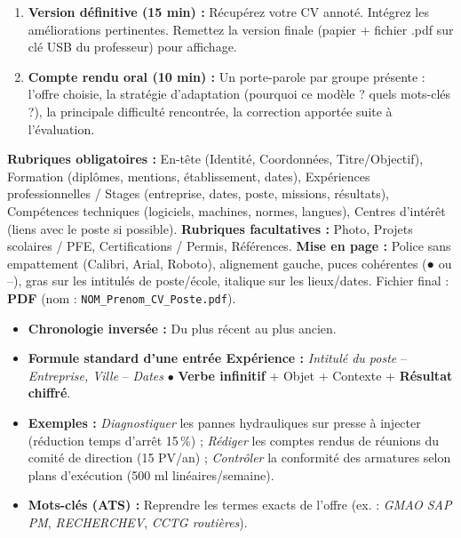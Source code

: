 \documentclass[11pt]{article}
\newcounter{popsec}
\newcounter{popsub}
\newcommand{\courssub}[1]{%
  \stepcounter{popsub}%
  \par\vspace{9pt}\noindent{\popxbold\fontsize{11.5}{13}\selectfont\color{popink}{\color{poporange}\thepopsec.\thepopsub}\hspace{6pt}#1}\par\nopagebreak\vspace{4pt}
}
\begin{document}
\begin{enumerate}
    \item \textbf{Version définitive (15 min) :} Récupérez votre CV annoté. Intégrez les améliorations pertinentes. Remettez la version finale (papier + fichier .pdf sur clé USB du professeur) pour affichage.
    \item \textbf{Compte rendu oral (10 min) :} Un porte-parole par groupe présente : l'offre choisie, la stratégie d'adaptation (pourquoi ce modèle ? quels mots-clés ?), la principale difficulté rencontrée, la correction apportée suite à l'évaluation.
\end{enumerate}

\courssub{Ressources à mobiliser}
\begin{aretenir}
\textbf{Rubriques obligatoires :} En-tête (Identité, Coordonnées, Titre/Objectif), Formation (diplômes, mentions, établissement, dates), Expériences professionnelles / Stages (entreprise, dates, poste, missions, résultats), Compétences techniques (logiciels, machines, normes, langues), Centres d'intérêt (liens avec le poste si possible).
\textbf{Rubriques facultatives :} Photo, Projets scolaires / PFE, Certifications / Permis, Références.
\textbf{Mise en page :} Police sans empattement (Calibri, Arial, Roboto), alignement gauche, puces cohérentes (● ou --), gras sur les intitulés de poste/école, italique sur les lieux/dates. Fichier final : \textbf{PDF} (nom : \texttt{NOM\_Prenom\_CV\_Poste.pdf}).
\end{aretenir}

\begin{aretenir}
\begin{itemize}
    \item \textbf{Chronologie inversée :} Du plus récent au plus ancien.
    \item \textbf{Formule standard d'une entrée Expérience :} \emph{Intitulé du poste} -- \emph{Entreprise, Ville} -- \emph{Dates} \newline $\bullet$ \textbf{Verbe infinitif} + Objet + Contexte + \textbf{Résultat chiffré}.
    \item \textbf{Exemples :} \emph{Diagnostiquer} les pannes hydrauliques sur presse à injecter (réduction temps d'arrêt 15\,\%) ; \emph{Rédiger} les comptes rendus de réunions du comité de direction (15 PV/an) ; \emph{Contrôler} la conformité des armatures selon plans d'exécution (500 ml linéaires/semaine).
    \item \textbf{Mots-clés (ATS) :} Reprendre les termes exacts de l'offre (ex. : \emph{GMAO SAP PM}, \emph{RECHERCHEV}, \emph{CCTG routières}).
\end{itemize}
\end{aretenir}
\end{document}
